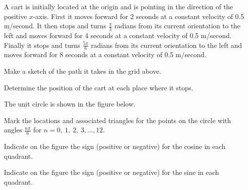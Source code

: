 \begin{problem}
\item A cart is initially located at the origin and is pointing in the
  direction of the positive $x$-axis. First it moves forward for 2
  seconds at a constant velocity of 0.5 m/second. It then stops and
  turns $\frac{\pi}{3}$ radians from its current orientation to the
  left and moves forward for 4 seconds at a constant velocity of 0.5
  m/second. Finally it stops and turns $\frac{5\pi}{6}$ radians from
  its current orientation to the left and moves forward for 8 seconds
  at a constant velocity of 0.5 m/second.

  \scalebox{0.65}{}

  \begin{subproblem}
    \item Make a sketch of the path it takes in the grid above.
    \item Determine the position of the cart at each place where it
      stops.
      \vfill
  \end{subproblem}

  \clearpage

\item The unit circle is shown in the figure below.

  \scalebox{0.85}{}

  \begin{subproblem}
  \item Mark the locations and associated triangles for the points on
    the circle with angles $\frac{n\pi}{6}$ for $n=0,~1,~2,~3,\ldots,12$.
  \item Indicate on the figure the sign (positive or negative) for the
    cosine in each quadrant.
  \item Indicate on the figure the sign (positive or negative) for the
    sine in each quadrant.

    \clearpage


\end{subproblem}
\end{problem}
